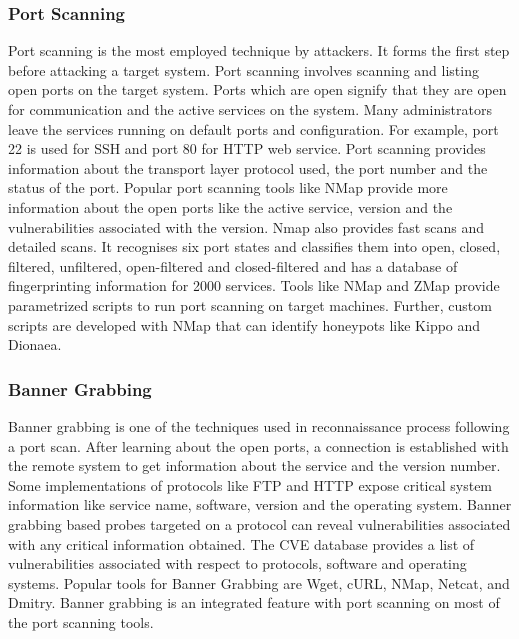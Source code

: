 \documentclass[letterpaper, 10 pt, conference]{ieeeconf}  %
\begin{document}
\subsubsection{Port Scanning}
Port scanning is the most employed technique by attackers. It forms the first step before attacking a target system. Port scanning involves scanning and listing open ports on the target system. Ports which are open signify that they are open for communication and the active services on the system. Many administrators leave the services running on default ports and configuration. For example, port 22 is used for SSH and port 80 for HTTP web service. Port scanning provides information about the transport layer protocol used, the port number and the status of the port. Popular port scanning tools like NMap\cite{NMap} provide more information about the open ports like the active service, version and the vulnerabilities associated with the version. Nmap also provides fast scans and detailed scans. It recognises six port states and classifies them into open, closed, filtered, unfiltered, open-filtered and closed-filtered and has a database of fingerprinting information for 2000 services. 
Tools like NMap and ZMap \cite{zmap} provide parametrized scripts to run port scanning on target machines. Further, custom scripts are developed with NMap that can identify honeypots like Kippo and Dionaea.  
\newline
\subsubsection{Banner Grabbing}
Banner grabbing is one of the techniques used in reconnaissance process following a port scan. After learning about the open ports, a connection is established with the remote system to get information about the service and the version number. Some implementations of protocols like FTP and HTTP expose critical system information like service name, software, version and the operating system. Banner grabbing based probes targeted on a protocol can reveal vulnerabilities associated with any critical information obtained. The CVE database \cite{CVE} provides a list of vulnerabilities associated with respect to protocols, software and operating systems. Popular tools for Banner Grabbing are Wget, cURL, NMap, Netcat, and Dmitry. Banner grabbing is an integrated feature with port scanning on most of the port scanning tools.  
\newline
\end{document}
